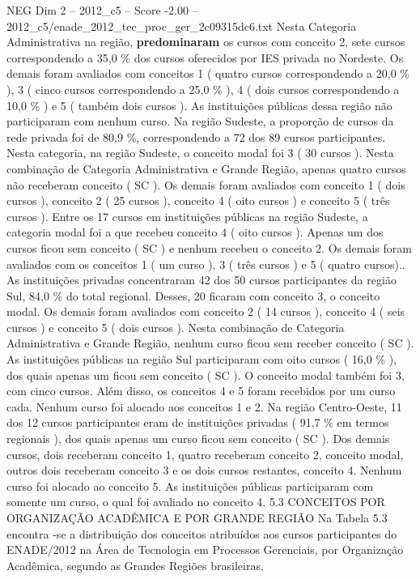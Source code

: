 \begin{textsample}{NEG Dim 2 – 2012\_c5 – Score -2.00 – 2012\_c5/enade\_2012\_tec\_proc\_ger\_2c09315dc6.txt}
Nesta Categoria Administrativa na região, \textbf{predominaram} os cursos com conceito 2, sete cursos correspondendo a 35,0 \% dos cursos oferecidos por IES privada no Nordeste.
Os demais foram avaliados com conceitos 1 ( quatro cursos correspondendo a 20,0 \% ), 3 ( cinco cursos correspondendo a 25,0 \% ), 4 ( dois cursos correspondendo a 10,0 \% ) e 5 ( também dois cursos ).
As instituições públicas dessa região não participaram com nenhum curso.
Na região Sudeste, a proporção de cursos da rede privada foi de 80,9 \%, correspondendo a 72 dos 89 cursos participantes.
Nesta categoria, na região Sudeste, o conceito modal foi 3 ( 30 cursos ).
Nesta combinação de Categoria Administrativa e Grande Região, apenas quatro cursos não receberam conceito ( SC ).
Os demais foram avaliados com conceito 1 ( dois cursos ), conceito 2 ( 25 cursos ), conceito 4 ( oito cursos ) e conceito 5 ( três cursos ).
Entre os 17 cursos em instituições públicas na região Sudeste, a categoria modal foi a que recebeu conceito 4 ( oito cursos ).
Apenas um dos cursos ficou sem conceito ( SC ) e nenhum recebeu o conceito 2.
Os demais foram avaliados com os conceitos 1 ( um curso ), 3 ( três cursos ) e 5 ( quatro cursos)..
As instituições privadas concentraram 42 dos 50 cursos participantes da região Sul, 84,0 \% do total regional.
Desses, 20 ficaram com conceito 3, o conceito modal.
Os demais foram avaliados com conceito 2 ( 14 cursos ), conceito 4 ( seis cursos ) e conceito 5 ( dois cursos ).
Nesta combinação de Categoria Administrativa e Grande Região, nenhum curso ficou sem receber conceito ( SC ).
As instituições públicas na região Sul participaram com oito cursos ( 16,0 \% ), dos quais apenas um ficou sem conceito ( SC ).
O conceito modal também foi 3, com cinco cursos.
Além disso, os conceitos 4 e 5 foram recebidos por um curso cada.
Nenhum curso foi alocado aos conceitos 1 e 2.
Na região Centro-Oeste, 11 dos 12 cursos participantes eram de instituições privadas ( 91,7 \% em termos regionais ), dos quais apenas um curso ficou sem conceito ( SC ).
Dos demais cursos, dois receberam conceito 1, quatro receberam conceito 2, conceito modal, outros dois receberam conceito 3 e os dois cursos restantes, conceito 4.
Nenhum curso foi alocado ao conceito 5.
As instituições públicas participaram com somente um curso, o qual foi avaliado no conceito 4. 5.3 CONCEITOS POR ORGANIZAÇÃO ACADÊMICA E POR GRANDE REGIÃO Na Tabela 5.3 encontra -se a distribuição dos conceitos atribuídos aos cursos participantes do ENADE/2012 na Área de Tecnologia em Processos Gerenciais, por Organização Acadêmica, segundo as Grandes Regiões brasileiras.

\end{textsample}
